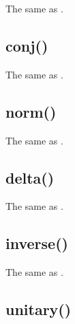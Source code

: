 \documentclass[letterpaper,10pt,english]{sphinxmanual}
\begin{document}
The same as .


\subsection{conj()}
\label{functions:conj}

\begin{fulllineitems}
\end{fulllineitems}


The same as .


\subsection{norm()}
\label{functions:norm}

\begin{fulllineitems}
\end{fulllineitems}


The same as .


\subsection{delta()}
\label{functions:delta}

\begin{fulllineitems}
\end{fulllineitems}


The same as .


\subsection{inverse()}
\label{functions:inverse}

\begin{fulllineitems}
\end{fulllineitems}


The same as .


\subsection{unitary()}
\label{functions:unitary}
\end{document}
